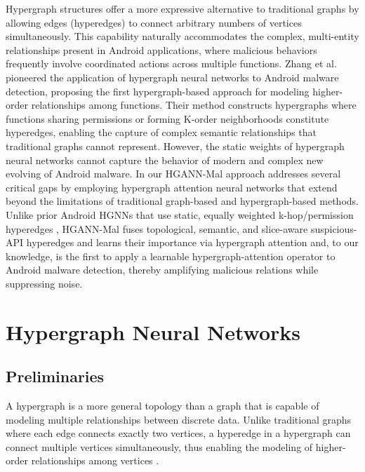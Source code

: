 \documentclass[runningheads]{llncs}
\begin{document}
Hypergraph structures offer a more expressive alternative to traditional graphs by allowing edges (hyperedges) to connect arbitrary numbers of vertices simultaneously. This capability naturally accommodates the complex, multi-entity relationships present in Android applications, where malicious behaviors frequently involve coordinated actions across multiple functions. Zhang et al. \cite{zhang2023} pioneered the application of hypergraph neural networks to Android malware detection, proposing the first hypergraph-based approach for modeling higher-order relationships among functions. Their method constructs hypergraphs where functions sharing permissions or forming K-order neighborhoods constitute hyperedges, enabling the capture of complex semantic relationships that traditional graphs cannot represent. However, the static weights of hypergraph neural networks cannot capture the behavior of modern and complex new evolving of Android malware. In our HGANN-Mal approach addresses several critical gaps by employing hypergraph attention neural networks that extend beyond the limitations of traditional graph-based and hypergraph-based methods. Unlike prior Android HGNNs that use static, equally weighted k-hop/permission hyperedges \cite{zhang2023}, HGANN-Mal fuses topological, semantic, and slice-aware suspicious-API hyperedges and learns their importance via hypergraph attention and, to our knowledge, is the first to apply a learnable hypergraph-attention operator to Android malware detection, thereby amplifying malicious relations while suppressing noise.



\section{Hypergraph Neural Networks}


\subsection{Preliminaries}
A hypergraph is a more general topology than a graph that is capable of modeling multiple relationships between discrete data. Unlike traditional graphs where each edge connects exactly two vertices, a hyperedge in a hypergraph can connect multiple vertices simultaneously, thus enabling the modeling of higher-order relationships among vertices \cite{agarwal2006higher}.
\end{document}

